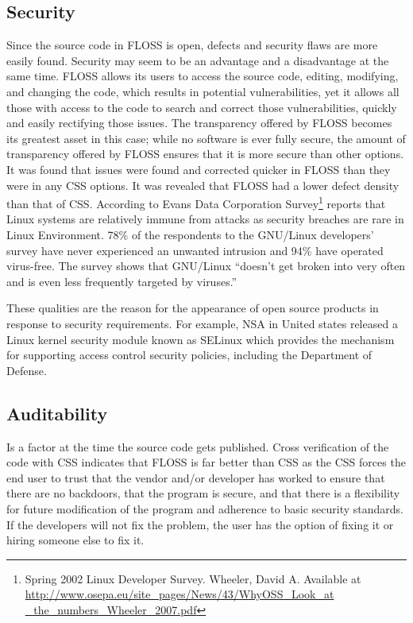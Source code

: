  \subsection{Security }
 Since the source code in FLOSS is open, defects and security flaws are more easily found.	Security may seem to be an advantage and a disadvantage at the same time. FLOSS allows its users to access the source code, editing, modifying, and changing the code, which results in potential vulnerabilities, yet it allows all those with access to the code to search and correct those vulnerabilities, quickly and easily rectifying those issues. The transparency offered by FLOSS becomes its greatest asset in this case; while no software is ever fully secure, the amount of transparency offered by FLOSS ensures that it is more secure than other options. It was found that issues were found and corrected quicker in FLOSS than they were in any CSS options. It was revealed that FLOSS had a lower defect density than that of CSS.
 	According to Evans Data Corporation Survey\footnote{Spring 2002 Linux Developer Survey. Wheeler,  David A. Available at \url{http://www.osepa.eu/site\_pages/News/43/WhyOSS\_Look\_at \_the\_numbers\_Wheeler\_2007.pdf}} reports that Linux systems are relatively immune from attacks as security breaches are rare in Linux Environment. 78\% of the respondents to the GNU/Linux developers’ survey have never experienced an unwanted intrusion and 94\% have operated virus-free. The survey shows that GNU/Linux ``doesn’t get broken into very often and is even less frequently targeted by viruses.''
 	
 	These qualities are the reason for the appearance of open source products in response to security requirements. For example, \ac{NSA} in United states released a Linux kernel security module known as \ac{SELinux} which provides the mechanism for supporting access control security policies, including the Department of Defense.
   \subsection {Auditability}
   
   Is a factor at the time the source code gets published. Cross verification of the code with  CSS indicates that FLOSS is far better than CSS as the CSS forces the end user to trust that the vendor and/or developer has worked to ensure that there are no backdoors, that the program is secure, and that there is a flexibility for future modification of the program and adherence to basic security standards. If the developers will not fix the problem, the user has the option of fixing it or hiring someone else to fix it. 
   
